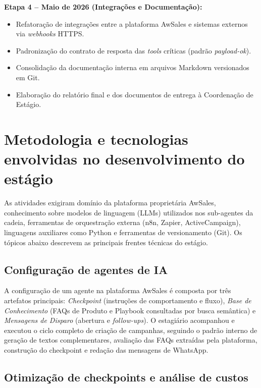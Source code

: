 \documentclass[12pt,a4paper,oneside]{article}
\begin{document}
\textbf{Etapa 4 -- Maio de 2026 (Integrações e Documentação):}
\begin{itemize}[leftmargin=2em,topsep=0pt]
  \item Refatoração de integrações entre a plataforma AwSales e sistemas externos via \textit{webhooks} HTTPS.
  \item Padronização do contrato de resposta das \textit{tools} críticas (padrão \textit{payload-ok}).
  \item Consolidação da documentação interna em arquivos Markdown versionados em Git.
  \item Elaboração do relatório final e dos documentos de entrega à Coordenação de Estágio.
\end{itemize}

\section{Metodologia e tecnologias envolvidas no desenvolvimento do estágio}

As atividades exigiram domínio da plataforma proprietária AwSales, conhecimento sobre modelos de linguagem (LLMs) utilizados nos sub-agentes da cadeia, ferramentas de orquestração externa (n8n, Zapier, ActiveCampaign), linguagens auxiliares como Python e ferramentas de versionamento (Git). Os tópicos abaixo descrevem as principais frentes técnicas do estágio.

\subsection{Configuração de agentes de IA}

A configuração de um agente na plataforma AwSales é composta por três artefatos principais: \textit{Checkpoint} (instruções de comportamento e fluxo), \textit{Base de Conhecimento} (FAQs de Produto e Playbook consultadas por busca semântica) e \textit{Mensagens de Disparo} (abertura e \textit{follow-ups}). O estagiário acompanhou e executou o ciclo completo de criação de campanhas, seguindo o padrão interno de geração de textos complementares, avaliação das FAQs extraídas pela plataforma, construção do checkpoint e redação das mensagens de WhatsApp.

\subsection{Otimização de checkpoints e análise de custos}
\end{document}
